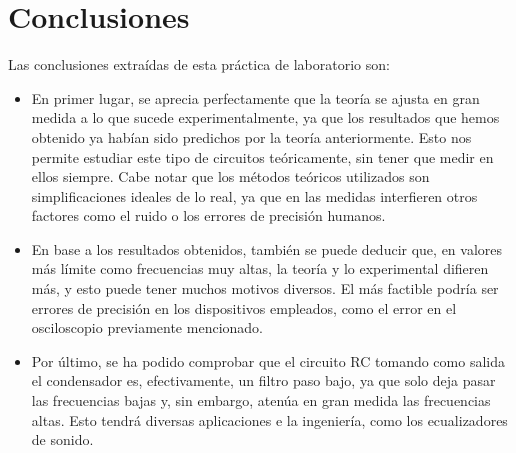 \section{Conclusiones}
Las conclusiones extraídas de esta práctica de laboratorio son:
\begin{itemize}
    \item En primer lugar, se aprecia perfectamente que la teoría se ajusta en gran medida a lo que sucede experimentalmente, ya que los resultados que hemos obtenido ya habían sido predichos por la teoría anteriormente. Esto nos permite estudiar este tipo de circuitos teóricamente, sin tener que medir en ellos siempre. Cabe notar que los métodos teóricos utilizados son simplificaciones ideales de lo real, ya que en las medidas interfieren otros factores como el ruido o los errores de precisión humanos.
    
    \item En base a los resultados obtenidos, también se puede deducir que, en valores más límite como frecuencias muy altas, la teoría y lo experimental difieren más, y esto puede tener muchos motivos diversos. El más factible podría ser errores de precisión en los dispositivos empleados, como el error en el osciloscopio previamente mencionado.

    \item Por último, se ha podido comprobar que el circuito RC tomando como salida el condensador es, efectivamente, un filtro paso bajo, ya que solo deja pasar las frecuencias bajas y, sin embargo, atenúa en gran medida las frecuencias altas. Esto tendrá diversas aplicaciones e la ingeniería, como los ecualizadores de sonido.
\end{itemize}
